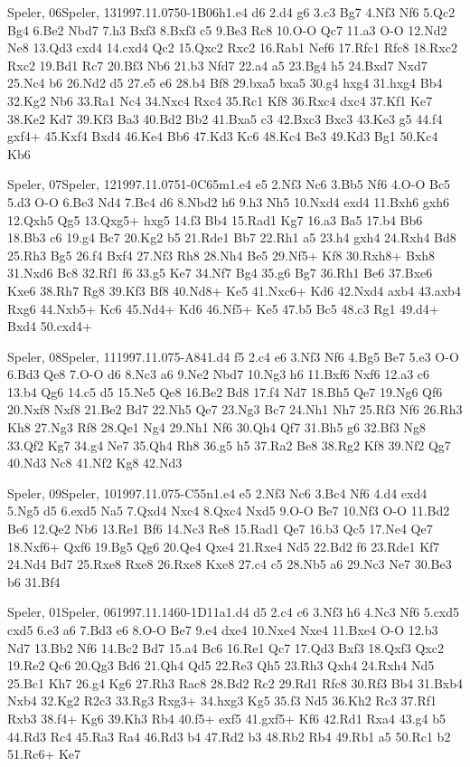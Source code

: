\documentclass[twocolumn,a4paper,10pt]{report}
\begin{document}
\begin{chessgame}{Speler, 06}{Speler, 13}{1997.11.07}{5}{0-1}{B06h}{1.e4 d6 2.d4 g6 3.c3 Bg7 4.Nf3 Nf6 5.Qc2 Bg4 6.Be2 Nbd7 7.h3 Bxf3 8.Bxf3 c5 9.Be3 Rc8 10.O-O Qc7 11.a3 O-O 12.Nd2 Ne8 13.Qd3 cxd4 14.cxd4 Qc2 15.Qxc2 Rxc2 16.Rab1 Nef6 17.Rfc1 Rfc8 18.Rxc2 Rxc2 19.Bd1 Rc7 20.Bf3 Nb6 21.b3 Nfd7 22.a4 a5 23.Bg4 h5 24.Bxd7 Nxd7 25.Nc4 b6 26.Nd2 d5 27.e5 e6 28.b4 Bf8 29.bxa5 bxa5 30.g4 hxg4 31.hxg4 Bb4 32.Kg2 Nb6 33.Ra1 Nc4 34.Nxc4 Rxc4 35.Rc1 Kf8 36.Rxc4 dxc4 37.Kf1 Ke7 38.Ke2 Kd7 39.Kf3 Ba3 40.Bd2 Bb2 41.Bxa5 c3 42.Bxc3 Bxc3 43.Ke3 g5 44.f4 gxf4+ 45.Kxf4 Bxd4 46.Ke4 Bb6 47.Kd3 Kc6 48.Kc4 Be3 49.Kd3 Bg1 50.Kc4 Kb6}\end{chessgame}
\begin{chessgame}{Speler, 07}{Speler, 12}{1997.11.07}{5}{1-0}{C65m}{1.e4 e5 2.Nf3 Nc6 3.Bb5 Nf6 4.O-O Bc5 5.d3 O-O 6.Be3 Nd4 7.Bc4 d6 8.Nbd2 h6 9.h3 Nh5 10.Nxd4 exd4 11.Bxh6 gxh6 12.Qxh5 Qg5 13.Qxg5+ hxg5 14.f3 Bb4 15.Rad1 Kg7 16.a3 Ba5 17.b4 Bb6 18.Bb3 c6 19.g4 Bc7 20.Kg2 b5 21.Rde1 Bb7 22.Rh1 a5 23.h4 gxh4 24.Rxh4 Bd8 25.Rh3 Bg5 26.f4 Bxf4 27.Nf3 Rh8 28.Nh4 Be5 29.Nf5+ Kf8 30.Rxh8+ Bxh8 31.Nxd6 Bc8 32.Rf1 f6 33.g5 Ke7 34.Nf7 Bg4 35.g6 Bg7 36.Rh1 Be6 37.Bxe6 Kxe6 38.Rh7 Rg8 39.Kf3 Bf8 40.Nd8+ Ke5 41.Nxc6+ Kd6 42.Nxd4 axb4 43.axb4 Rxg6 44.Nxb5+ Kc6 45.Nd4+ Kd6 46.Nf5+ Ke5 47.b5 Bc5 48.c3 Rg1 49.d4+ Bxd4 50.cxd4+}\end{chessgame}
\begin{chessgame}{Speler, 08}{Speler, 11}{1997.11.07}{5}{\textonehalf-\textonehalf}{A84}{1.d4 f5 2.c4 e6 3.Nf3 Nf6 4.Bg5 Be7 5.e3 O-O 6.Bd3 Qe8 7.O-O d6 8.Nc3 a6 9.Ne2 Nbd7 10.Ng3 h6 11.Bxf6 Nxf6 12.a3 c6 13.b4 Qg6 14.c5 d5 15.Ne5 Qe8 16.Be2 Bd8 17.f4 Nd7 18.Bh5 Qe7 19.Ng6 Qf6 20.Nxf8 Nxf8 21.Be2 Bd7 22.Nh5 Qe7 23.Ng3 Bc7 24.Nh1 Nh7 25.Rf3 Nf6 26.Rh3 Kh8 27.Ng3 Rf8 28.Qe1 Ng4 29.Nh1 Nf6 30.Qh4 Qf7 31.Bh5 g6 32.Bf3 Ng8 33.Qf2 Kg7 34.g4 Ne7 35.Qh4 Rh8 36.g5 h5 37.Ra2 Be8 38.Rg2 Kf8 39.Nf2 Qg7 40.Nd3 Nc8 41.Nf2 Kg8 42.Nd3}\end{chessgame}
\begin{chessgame}{Speler, 09}{Speler, 10}{1997.11.07}{5}{\textonehalf-\textonehalf}{C55n}{1.e4 e5 2.Nf3 Nc6 3.Bc4 Nf6 4.d4 exd4 5.Ng5 d5 6.exd5 Na5 7.Qxd4 Nxc4 8.Qxc4 Nxd5 9.O-O Be7 10.Nf3 O-O 11.Bd2 Be6 12.Qe2 Nb6 13.Re1 Bf6 14.Nc3 Re8 15.Rad1 Qe7 16.b3 Qc5 17.Ne4 Qe7 18.Nxf6+ Qxf6 19.Bg5 Qg6 20.Qe4 Qxe4 21.Rxe4 Nd5 22.Bd2 f6 23.Rde1 Kf7 24.Nd4 Bd7 25.Rxe8 Rxe8 26.Rxe8 Kxe8 27.c4 c5 28.Nb5 a6 29.Nc3 Ne7 30.Be3 b6 31.Bf4}\end{chessgame}
\begin{chessgame}{Speler, 01}{Speler, 06}{1997.11.14}{6}{0-1}{D11a}{1.d4 d5 2.c4 c6 3.Nf3 h6 4.Nc3 Nf6 5.cxd5 cxd5 6.e3 a6 7.Bd3 e6 8.O-O Be7 9.e4 dxe4 10.Nxe4 Nxe4 11.Bxe4 O-O 12.b3 Nd7 13.Bb2 Nf6 14.Bc2 Bd7 15.a4 Bc6 16.Re1 Qc7 17.Qd3 Bxf3 18.Qxf3 Qxc2 19.Re2 Qc6 20.Qg3 Bd6 21.Qh4 Qd5 22.Re3 Qh5 23.Rh3 Qxh4 24.Rxh4 Nd5 25.Bc1 Kh7 26.g4 Kg6 27.Rh3 Rac8 28.Bd2 Rc2 29.Rd1 Rfc8 30.Rf3 Bb4 31.Bxb4 Nxb4 32.Kg2 R2c3 33.Rg3 Rxg3+ 34.hxg3 Kg5 35.f3 Nd5 36.Kh2 Rc3 37.Rf1 Rxb3 38.f4+ Kg6 39.Kh3 Rb4 40.f5+ exf5 41.gxf5+ Kf6 42.Rd1 Rxa4 43.g4 b5 44.Rd3 Rc4 45.Ra3 Ra4 46.Rd3 b4 47.Rd2 b3 48.Rb2 Rb4 49.Rb1 a5 50.Rc1 b2 51.Rc6+ Ke7}\end{chessgame}
\end{document}
